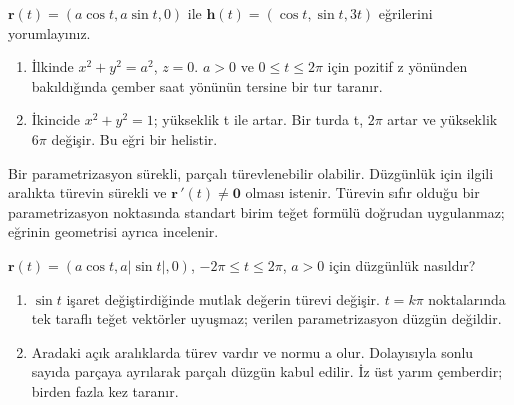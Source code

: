 \begin{tcolorbox}[title={Örnek 3.5 | Çember ve helis},colframe=accent]\(\mathbf r(t)=(a\cos t,a\sin t,0)\) ile \(\mathbf h(t)=(\cos t,\sin t,3t)\) eğrilerini yorumlayınız.
\par{}\end{tcolorbox}
\begin{tcolorbox}[title={Adım adım çözüm},colback=green!3!white,colframe=green]\begin{enumerate}
\item İlkinde \(x^2+y^2=a^2\), \(z=0\). \(a>0\) ve \(0\le t\le2\pi\) için pozitif z yönünden bakıldığında çember saat yönünün tersine bir tur taranır.
\item İkincide \(x^2+y^2=1\); yükseklik t ile artar. Bir turda t, \(2\pi\) artar ve yükseklik \(6\pi\) değişir. Bu eğri bir helistir.
\end{enumerate}\end{tcolorbox}
Bir parametrizasyon sürekli, parçalı türevlenebilir olabilir. Düzgünlük için ilgili aralıkta türevin sürekli ve \(\mathbf r\,\prime(t)\ne\mathbf0\) olması istenir. Türevin sıfır olduğu bir parametrizasyon noktasında standart birim teğet formülü doğrudan uygulanmaz; eğrinin geometrisi ayrıca incelenir.

\begin{tcolorbox}[title={Örnek 3.6 | Parçalı düzgün eğri},colframe=accent]\(\mathbf r(t)=(a\cos t,a|\sin t|,0)\), \(-2\pi\le t\le2\pi\), \(a>0\) için düzgünlük nasıldır?
\par{}\end{tcolorbox}
\begin{tcolorbox}[title={Adım adım çözüm},colback=green!3!white,colframe=green]\begin{enumerate}
\item \(\sin t\) işaret değiştirdiğinde mutlak değerin türevi değişir. \(t=k\pi\) noktalarında tek taraflı teğet vektörler uyuşmaz; verilen parametrizasyon düzgün değildir.
\item Aradaki açık aralıklarda türev vardır ve normu a olur. Dolayısıyla sonlu sayıda parçaya ayrılarak parçalı düzgün kabul edilir. İz üst yarım çemberdir; birden fazla kez taranır.
\end{enumerate}\end{tcolorbox}
